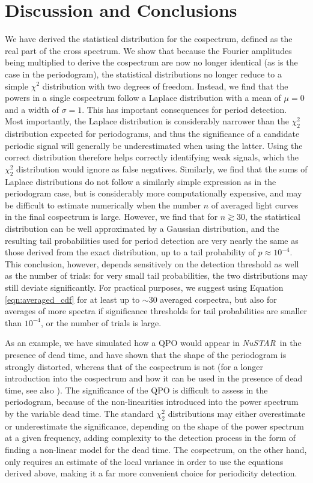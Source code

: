 \documentclass[12pt]{emulateapj}
\newcommand{\project}[1]{\textsl{#1}}
\newcommand{\nustar}{\project{NuSTAR}\xspace}
\begin{document}
\section{Discussion and Conclusions}
\label{sec:discussion}
We have derived the statistical distribution for the cospectrum, defined as the real part of the cross spectrum. We show that because the Fourier amplitudes being multiplied to derive the cospectrum are now no longer identical (as is the case in the periodogram), the statistical distributions no longer reduce to a simple $\chi^2$ distribution with two degrees of freedom. Instead, we find that the powers in a single cospectrum follow a Laplace distribution with a mean of $\mu=0$ and a width of $\sigma=1$. This has important consequences for period detection. Most importantly, the Laplace distribution is considerably narrower than the $\chi^2_2$ distribution expected for periodograms, and thus the significance of a candidate periodic signal will generally be underestimated when using the latter. Using the correct distribution therefore helps correctly identifying weak signals, which the $\chi^2_2$ distribution would ignore as false negatives. 
Similarly, we find that the sums of Laplace distributions do not follow a similarly simple expression as in the periodogram case, but is considerably more computationally expensive, and may be difficult to estimate numerically when the number $n$ of averaged light curves in the final cospectrum is large. However, we find that for $n \gtrsim 30$, the statistical distribution can be well approximated by a Gaussian distribution, and the resulting tail probabilities used for period detection are very nearly the same as those derived from the exact distribution, up to a tail probability of $p \approx 10^{-4}$. This conclusion, however, depends sensitively on the detection threshold as well as the number of trials: for very small tail probabilities, the two distributions may still deviate significantly. For practical purposes, we suggest using Equation \ref{eqn:averaged_cdf} for at least up to $\sim$30 averaged cospectra, but also for averages of more spectra if significance thresholds for tail probabilities are smaller than $10^{-4}$, or the number of trials is large. 

As an example, we have simulated how a QPO would appear in \nustar\ in the presence of dead time, and have shown that the shape of the periodogram is strongly distorted, whereas that of the cospectrum is not (for a longer introduction into the cospectrum and how it can be used in the presence of dead time, see also \citealt{Bachetti+15}). The significance of the QPO is difficult to assess in the periodogram, because of the non-linearities introduced into the power spectrum by the variable dead time. The standard $\chi^2_2$ distributions may either overestimate or underestimate the significance, depending on the shape of the power spectrum at a given frequency, adding complexity to the detection process in the form of finding a non-linear model for the dead time. The cospectrum, on the other hand, only requires an estimate of the local variance in order to use the equations derived above, making it a far more convenient choice for periodicity detection.
\end{document}
